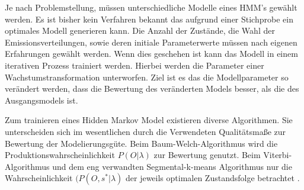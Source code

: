 Je nach Problemstellung, müssen unterschiedliche Modelle eines HMM's gewählt werden. Es ist bisher kein Verfahren bekannt das aufgrund einer Stichprobe ein optimales Modell generieren kann. Die Anzahl der Zustände, die Wahl der Emissionsverteilungen, sowie deren initiale Parameterwerte müssen nach eigenen Erfahrungen gewählt werden. Wenn dies geschehen ist kann das Modell in einem iterativen Prozess trainiert werden. Hierbei werden die Parameter einer Wachstumstransformation unterworfen. Ziel ist es das die Modellparameter so verändert werden, dass die Bewertung des veränderten Models besser, als die des Ausgangsmodels ist.

Zum trainieren eines Hidden Markov Model existieren diverse Algorithmen. Sie unterscheiden sich im wesentlichen durch die Verwendeten Qualitätsmaße zur Bewertung der Modelierungsgüte. Beim Baum-Welch-Algorithmus \cite{rabiner} wird die Produktionswahrscheinlichkeit \(P(O|\lambda)\) zur Bewertung genutzt. Beim Viterbi-Algorithmus \cite{viterbi} und dem eng verwandten Segmental-k-means Algorithmus \cite{juang} nur die Wahrscheinlichkeit \((P(O,s^{*}|\lambda)\) der jeweils optimalen Zustandsfolge betrachtet \cite{mmmFink}.
